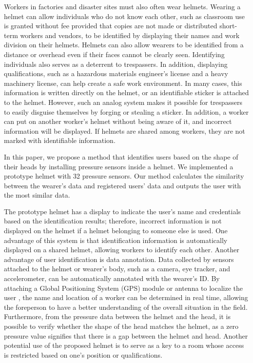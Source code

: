 \documentclass[sigconf,authordraft]{acmart}
\begin{document}
Workers in factories and disaster sites must also often wear helmets. Wearing a helmet can allow individuals who do not know each other, such as classroom use is granted without fee provided that copies are not made or distributed short-term workers and vendors, to be identified by displaying their names and work division on their helmets. Helmets can also allow wearers to be identified from a distance or overhead even if their faces cannot be clearly seen. Identifying individuals also serves as a deterrent to trespassers. In addition, displaying qualifications, such as a hazardous materials engineer's license and a heavy machinery license, can help create a safe work environment. In many cases, this information is written directly on the helmet, or an identifiable sticker is attached to the helmet. However, such an analog system makes it possible for trespassers to easily disguise themselves by forging or stealing a sticker. In addition, a worker can put on another worker's helmet without being aware of it, and incorrect information will be displayed. If helmets are shared among workers, they are not marked with identifiable information.\par

In this paper, we propose a method that identifies users based on the shape of their heads by installing pressure sensors inside a helmet. We implemented a prototype helmet with 32 pressure sensors. Our method calculates the similarity between the wearer's data and registered users' data and outputs the user with the most similar data.\par

The prototype helmet has a display to indicate the user's name and credentials based on the identification results; therefore, incorrect information is not displayed on the helmet if a helmet belonging to someone else is used. One advantage of this system is that identification information is automatically displayed on a shared helmet, allowing workers to identify each other. Another advantage of user identification is data annotation. Data collected by sensors attached to the helmet or wearer's body, such as a camera, eye tracker, and accelerometer, can be automatically annotated with the wearer's ID. By attaching a Global Positioning System (GPS) module or antenna to localize the user \cite{disaster_en}, the name and location of a worker can be determined in real time, allowing the foreperson to have a better understanding of the overall situation in the field. Furthermore, from the pressure data between the helmet and the head, it is possible to verify whether the shape of the head matches the helmet, as a zero pressure value signifies that there is a gap between the helmet and head. Another potential use of the proposed helmet is to serve as a key to a room whose access is restricted based on one's position or qualifications.\par
\end{document}
